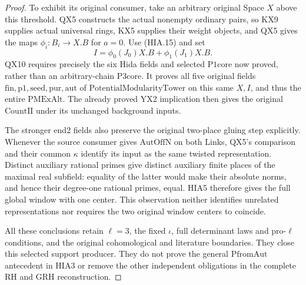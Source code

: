 \documentclass[11pt,a4paper]{article}
\numberwithin{equation}{section}
\theoremstyle{remark}\newtheorem{remark}[theorem]{Remark}
\begin{document}
\begin{proof}
To exhibit its original consumer, take an arbitrary original
Space \(X\) above this threshold.  QX5 constructs the
actual nonempty ordinary pairs, so KX9 supplies actual
universal rings, KX5 supplies their weight objects, and
QX5 gives the maps \(\phi_i:B_i\to X.B\) for \(a=0\).
Use (HIA.15) and set
\[
                    I=\phi_0(J_0)X.B+\phi_1(J_1)X.B.
 \tag{HIA.16}
\]
QX10 requires precisely the six Hida fields and selected
\(\mathrm{P1core}\) now proved, rather than an arbitrary-chain
\(\mathrm{P3core}\).  It proves all five original fields
\(\mathrm{fin},\mathrm{p1},\mathrm{seed},\mathrm{pur},\mathrm{aut}\)
of \(\mathrm{PotentialModularityTower}\) on this same
\(X,I\), and thus the entire \(\mathrm{PMExAlt}\).
The already proved YX2 implication then gives the original
\(\mathrm{CountII}\) under its unchanged background inputs.

The stronger end2 fields also preserve the original two-place
gluing step explicitly.  Whenever the source consumer gives
\(\mathrm{AutOffN}\) on both Links, QX5's comparison and
their common \(\kappa\) identify its input as the same
twisted representation.  Distinct auxiliary rational primes
give distinct auxiliary finite places of the maximal real subfield:
equality of the latter
would make their absolute norms, and hence their degree-one
rational primes, equal.  HIA5 therefore gives the full
global window with one center.  This observation neither
identifies unrelated representations nor requires the two
original window centers to coincide.

All these conclusions retain \(\ell=3\), the fixed
\(\iota\), full determinant laws and pro-\(\ell\) conditions,
and the original cohomological and literature boundaries.
They close this selected support producer.  They do not
prove the general \(\mathrm{PfromAut}\) antecedent in
HIA3 or remove the other independent obligations in the
complete RH and GRH reconstruction.
\end{proof}

\endgroup
\end{document}
